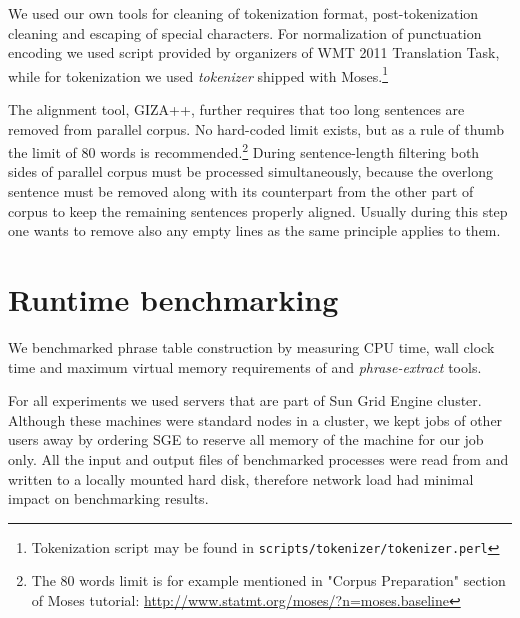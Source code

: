 We used our own tools for cleaning of tokenization format,
post-tokenization cleaning and escaping of special characters.
For normalization of punctuation encoding we used script provided by organizers of
WMT 2011 Translation Task,
while for tokenization we used \emph{tokenizer} shipped with
Moses.\footnote{Tokenization script may be found in \texttt{scripts/tokenizer/tokenizer.perl}}

The alignment tool, GIZA++, further requires that too long sentences are removed from parallel corpus.
No hard-coded limit exists, but as a rule of thumb the limit of 80 words is
recommended.\footnote{The 80 words limit is for example mentioned in "Corpus Preparation" section of Moses tutorial:
\url{http://www.statmt.org/moses/?n=moses.baseline}}
During sentence-length filtering both sides of parallel corpus must be processed simultaneously,
because the overlong sentence must be removed along with its counterpart from the other part of corpus
to keep the remaining sentences properly aligned.
Usually during this step one wants to remove also any empty lines as the same principle applies to them.

\section{Runtime benchmarking}

We benchmarked phrase table construction by measuring CPU time, wall clock time
and maximum virtual memory requirements of \eppex{} and \emph{phrase-extract} tools.

For all experiments we used servers that are part of Sun Grid Engine cluster.
Although these machines were standard nodes in a cluster, we kept jobs of other
users away by ordering SGE to reserve all memory of the machine for our job only.
All the input and output files of benchmarked processes were read from and written
to a locally mounted hard disk, therefore network load had minimal impact on
benchmarking results.

